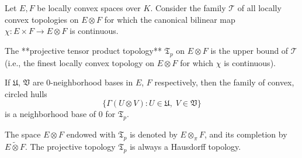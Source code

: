 Let $E, F$ be locally convex spaces over $K$. Consider the family $\mathcal{T}$ of all locally convex topologies on $E \otimes F$ for which the canonical bilinear map $\chi: E \times F \to E \otimes F$ is continuous.

The **projective tensor product topology** $\mathfrak{T}_p$ on $E \otimes F$ is the upper bound of $\mathcal{T}$ (i.e., the finest locally convex topology on $E \otimes F$ for which $\chi$ is continuous).

If $\mathfrak{U}$, $\mathfrak{V}$ are $0$-neighborhood bases in $E$, $F$ respectively, then the family of convex, circled hulls
$$\{\Gamma(U \otimes V) : U \in \mathfrak{U},\; V \in \mathfrak{V}\}$$
is a neighborhood base of $0$ for $\mathfrak{T}_p$.

The space $E \otimes F$ endowed with $\mathfrak{T}_p$ is denoted by $E \otimes_\pi F$, and its completion by $E \tilde{\otimes} F$. The projective topology $\mathfrak{T}_p$ is always a Hausdorff topology.
